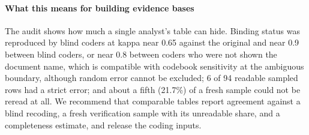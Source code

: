 \documentclass[conference]{IEEEtran}
\begin{document}
\paragraph{What this means for building evidence bases} The audit shows how much a single analyst's table can hide. Binding status was reproduced by blind coders at kappa near 0.65 against the original and near 0.9 between blind coders, or near 0.8 between coders who were not shown the document name, which is compatible with codebook sensitivity at the ambiguous boundary, although random error cannot be excluded; 6 of 94 readable sampled rows had a strict error; and about a fifth (21.7\%) of a fresh sample could not be reread at all. We recommend that comparable tables report agreement against a blind recoding, a fresh verification sample with its unreadable share, and a completeness estimate, and release the coding inputs.
\end{document}
